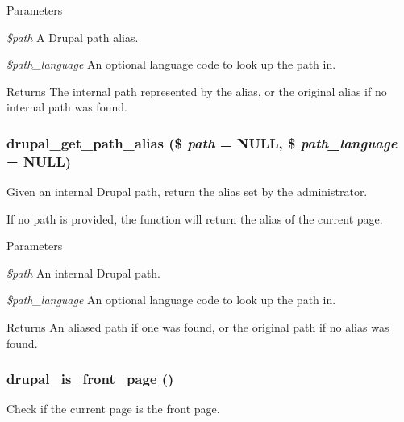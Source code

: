 \begin{DoxyParams}{Parameters}
\item[{\em \$path}]A Drupal path alias. \item[{\em \$path\_\-language}]An optional language code to look up the path in.\end{DoxyParams}
\begin{DoxyReturn}{Returns}
The internal path represented by the alias, or the original alias if no internal path was found. 
\end{DoxyReturn}
\hypertarget{path_8inc_a889ab7f9eebf37ac353abc264a290131}{
\subsubsection[{drupal\_\-get\_\-path\_\-alias}]{\setlength{\rightskip}{0pt plus 5cm}drupal\_\-get\_\-path\_\-alias (\$ {\em path} = {\ttfamily NULL}, \/  \$ {\em path\_\-language} = {\ttfamily NULL})}}
\label{path_8inc_a889ab7f9eebf37ac353abc264a290131}
Given an internal Drupal path, return the alias set by the administrator.

If no path is provided, the function will return the alias of the current page.


\begin{DoxyParams}{Parameters}
\item[{\em \$path}]An internal Drupal path. \item[{\em \$path\_\-language}]An optional language code to look up the path in.\end{DoxyParams}
\begin{DoxyReturn}{Returns}
An aliased path if one was found, or the original path if no alias was found. 
\end{DoxyReturn}
\hypertarget{path_8inc_a657eb4770879ad6f0dc19bfad2cd4a6d}{
\subsubsection[{drupal\_\-is\_\-front\_\-page}]{\setlength{\rightskip}{0pt plus 5cm}drupal\_\-is\_\-front\_\-page ()}}
\label{path_8inc_a657eb4770879ad6f0dc19bfad2cd4a6d}
Check if the current page is the front page.

